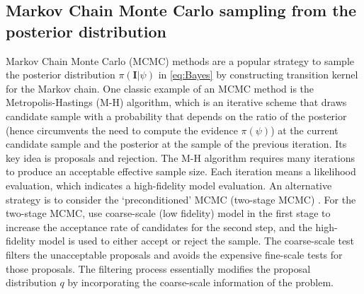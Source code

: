 \subsection{Markov Chain Monte Carlo sampling from the posterior distribution}
Markov Chain Monte Carlo (MCMC) methods are a popular strategy to sample the posterior distribution $\pi(\boldsymbol{I}|\psi)$ in \eqref{eq:Bayes} by constructing transition kernel for the Markov chain. One classic example of an MCMC method is the Metropolis-Hastings (M-H) algorithm, which is an iterative scheme that draws candidate sample with a probability that depends on the ratio of the posterior (hence circumvents the need to compute the evidence $\pi(\psi)$) at the current candidate sample and the posterior at the sample of the previous iteration. Its key idea is proposals and rejection. The M-H algorithm requires many iterations to produce an acceptable effective sample size. Each iteration means a likelihood evaluation, which indicates a high-fidelity model evaluation. An alternative strategy is to consider the `preconditioned' MCMC (two-stage MCMC) \cite{EfHoLu:2006}. For the two-stage MCMC, use coarse-scale (low fidelity) model in the first stage to increase the acceptance rate of candidates for the second step, and the high-fidelity model is used to either accept or reject the sample. The coarse-scale test filters the unacceptable proposals and avoids the expensive fine-scale tests for those proposals. The filtering process essentially modifies the proposal distribution $q$ by incorporating the coarse-scale information of the problem.


